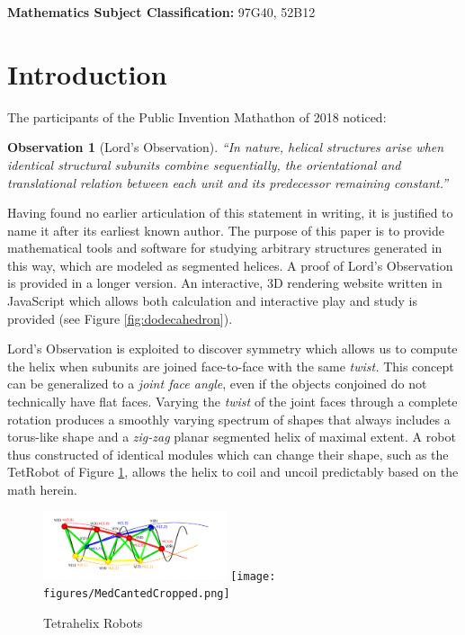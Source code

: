 \documentclass{svproc}
\newtheorem{observation}{Observation}
\begin{document}
\makeatletter
\newcommand{\subjclass}[1]{%
    \small
    \textbf{Mathematics Subject Classification:} #1}


\makeatother

\subjclass{ 97G40, 52B12}

\section{Introduction}

The participants of the Public Invention Mathathon of 2018\cite{read2019mathathon} noticed:
\begin{observation}[Lord's Observation]
  “In nature, helical structures arise when identical structural subunits combine sequentially, the orientational and translational relation between each unit and its predecessor remaining constant.”\cite{lord2002helical}
  \label{obs:lords}
\end{observation}
Having found no earlier articulation of this statement
in writing, it is justified to name it after its earliest known author.
The purpose of this paper is to provide mathematical
tools and software for studying arbitrary
structures generated in this way, which are modeled as segmented helices.
A proof of Lord's Observation is provided in a longer version\cite{readfullsegmentedhelix}.
An interactive, 3D rendering website written in JavaScript which allows both calculation and
interactive play and study is provided\cite{segmentedhelixinteractive}
(see Figure \ref{fig:dodecahedron}).

Lord's Observation is exploited to discover symmetry which allows us to compute the helix when subunits are joined face-to-face with
the same {\em twist.}
This concept can be generalized to a {\em joint face angle}, even if the
objects conjoined do not technically have flat faces.
Varying the {\em twist} of the joint faces through a complete rotation produces a smoothly varying
spectrum of shapes that always includes a torus-like shape and a
{\em zig-zag} planar segmented helix of maximal extent.
A robot thus constructed of identical modules which can change their shape, such as the TetRobot of Figure \ref{fig:tetrahelices}, allows the helix to coil and uncoil
predictably based on the math herein.

\begin{figure}
  \centering

{\includegraphics[width=0.48\textwidth]{figures/UnifiedDrawing.png}}
{\texttt{[image: figures/MedCantedCropped.png]}}
\caption{Tetrahelix Robots}\label{fig:tetrahelices}
\end{figure}
\end{document}
